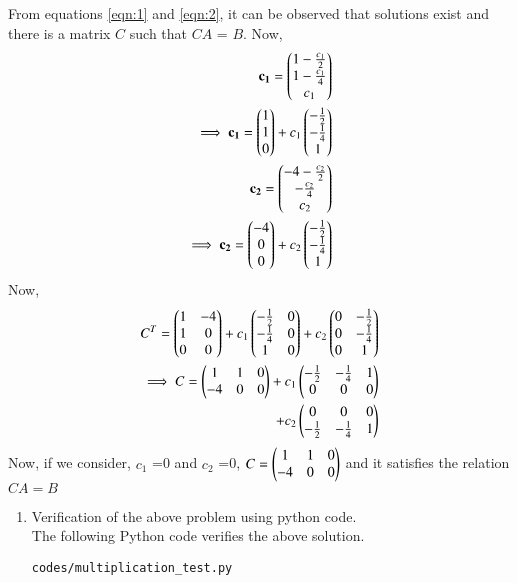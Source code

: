 \documentclass[journal,12pt,twocolumn]{IEEEtran}
\renewcommand\thesection{\arabic{section}}
\begin{document}
From equations \ref{eqn:1} and \ref{eqn:2}, it can be observed that solutions exist and there is a matrix $C$ such that $CA$ = $B$.
Now,
\begin{align}
\mathbf{c_1} = \begin{pmatrix}1- \frac{c_1}{2}\\1-\frac{c_1}{4}\\c_1\end{pmatrix}\\
\implies \mathbf{c_1} = \begin{pmatrix}1\\1\\0\end{pmatrix} + c_1\begin{pmatrix}-\frac{1}{2}\\-\frac{1}{4}\\1\end{pmatrix}\\
\mathbf{c_2} = \begin{pmatrix}-4- \frac{c_2}{2}\\-\frac{c_2}{4}\\c_2\end{pmatrix}\\
\implies \mathbf{c_2} = \begin{pmatrix}-4\\0\\0\end{pmatrix} + c_2\begin{pmatrix}-\frac{1}{2}\\-\frac{1}{4}\\1\end{pmatrix}
\end{align}
Now,
\begin{align}
C^T = \begin{pmatrix}1 & -4\\1 & 0\\0 & 0\end{pmatrix}+c_1\begin{pmatrix}-\frac{1}{2} & 0\\-\frac{1}{4} & 0\\1 & 0\end{pmatrix} + c_2\begin{pmatrix}0 & -\frac{1}{2}\\0 & -\frac{1}{4}\\0 & 1\end{pmatrix}\\
\implies C = \begin{pmatrix}1 & 1 & 0\\-4 & 0& 0\end{pmatrix} + c_1 \begin{pmatrix}-\frac{1}{2} & -\frac{1}{4} & 1\\0 & 0 &0\end{pmatrix}\\
+c_2\begin{pmatrix}0 & 0 &0\\-\frac{1}{2} & -\frac{1}{4} & 1\end{pmatrix}
\end{align}
Now, if we consider, $c_1$ =0 and $c_2$ =0, $C = \begin{pmatrix}1 & 1 & 0\\-4 & 0& 0\end{pmatrix}$ and it satisfies the relation $CA=B$
\renewcommand{\theequation}{\theenumi}
\begin{enumerate}[label=\thesection.\arabic*.,ref=\thesection.\theenumi]
\item Verification of the above problem using python code.\\
\solution The  following Python code verifies the above solution.
\begin{lstlisting}
codes/multiplication_test.py
\end{lstlisting}
\end{enumerate}
\end{document}
